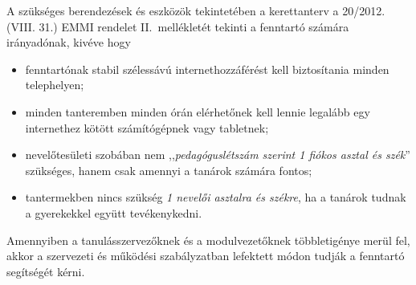 A szükséges berendezések és eszközök tekintetében a kerettanterv a	20/2012. (VIII. 31.) EMMI rendelet II.~mellékletét tekinti a fenntartó számára irányadónak, kivéve hogy
\begin{itemize}
    \item fenntartónak stabil szélessávú internethozzáférést kell biztosítania minden telephelyen;
    \item minden tanteremben minden órán elérhetőnek kell lennie legalább egy internethez kötött számítógépnek vagy tabletnek;
    \item nevelőtesületi szobában nem ,,\emph{pedagóguslétszám szerint 1 fiókos asztal és szék}'' szükséges, hanem csak amennyi a tanárok számára fontos;
    \item tantermekben nincs szükség \emph{1 nevelői asztalra és székre}, ha a tanárok tudnak a gyerekekkel együtt tevékenykedni.
\end{itemize}

Amennyiben a tanulásszervezőknek és a modulvezetőknek többletigénye merül fel, akkor a szervezeti és működési szabályzatban lefektett módon tudják a fenntartó segítségét kérni.